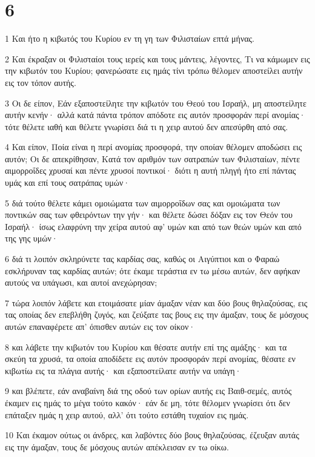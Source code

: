 \chapter{6}

\par 1 Και ήτο η κιβωτός του Κυρίου εν τη γη των Φιλισταίων επτά μήνας.
\par 2 Και έκραξαν οι Φιλισταίοι τους ιερείς και τους μάντεις, λέγοντες, Τι να κάμωμεν εις την κιβωτόν του Κυρίου; φανερώσατε εις ημάς τίνι τρόπω θέλομεν αποστείλει αυτήν εις τον τόπον αυτής.
\par 3 Οι δε είπον, Εάν εξαποστείλητε την κιβωτόν του Θεού του Ισραήλ, μη αποστείλητε αυτήν κενήν· αλλά κατά πάντα τρόπον απόδοτε εις αυτόν προσφοράν περί ανομίας· τότε θέλετε ιαθή και θέλετε γνωρίσει διά τι η χειρ αυτού δεν απεσύρθη από σας.
\par 4 Και είπον, Ποία είναι η περί ανομίας προσφορά, την οποίαν θέλομεν αποδώσει εις αυτόν; Οι δε απεκρίθησαν, Κατά τον αριθμόν των σατραπών των Φιλισταίων, πέντε αιμορροΐδες χρυσαί και πέντε χρυσοί ποντικοί· διότι η αυτή πληγή ήτο επί πάντας υμάς και επί τους σατράπας υμών·
\par 5 διά τούτο θέλετε κάμει ομοιώματα των αιμορροΐδων σας και ομοιώματα των ποντικών σας των φθειρόντων την γήν· και θέλετε δώσει δόξαν εις τον Θεόν του Ισραήλ· ίσως ελαφρύνη την χείρα αυτού αφ' υμών και από των θεών υμών και από της γης υμών·
\par 6 διά τι λοιπόν σκληρύνετε τας καρδίας σας, καθώς οι Αιγύπτιοι και ο Φαραώ εσκλήρυναν τας καρδίας αυτών; ότε έκαμε τεράστια εν τω μέσω αυτών, δεν αφήκαν αυτούς να υπάγωσι, και αυτοί ανεχώρησαν;
\par 7 τώρα λοιπόν λάβετε και ετοιμάσατε μίαν άμαξαν νέαν και δύο βους θηλαζούσας, εις τας οποίας δεν επεβλήθη ζυγός, και ζεύξατε τας βους εις την άμαξαν, τους δε μόσχους αυτών επαναφέρετε απ' όπισθεν αυτών εις τον οίκον·
\par 8 και λάβετε την κιβωτόν του Κυρίου και θέσατε αυτήν επί της αμάξης· και τα σκεύη τα χρυσά, τα οποία αποδίδετε εις αυτόν προσφοράν περί ανομίας, θέσατε εν κιβωτίω εις τα πλάγια αυτής· και εξαποστείλατε αυτήν να υπάγη·
\par 9 και βλέπετε, εάν αναβαίνη διά της οδού των ορίων αυτής εις Βαιθ-σεμές, αυτός έκαμεν εις ημάς το μέγα τούτο κακόν· εάν δε μη, τότε θέλομεν γνωρίσει ότι δεν επάταξεν ημάς η χειρ αυτού, αλλ' ότι τούτο εστάθη τυχαίον εις ημάς.
\par 10 Και έκαμον ούτως οι άνδρες, και λαβόντες δύο βους θηλαζούσας, έζευξαν αυτάς εις την άμαξαν, τους δε μόσχους αυτών απέκλεισαν εν τω οίκω.
